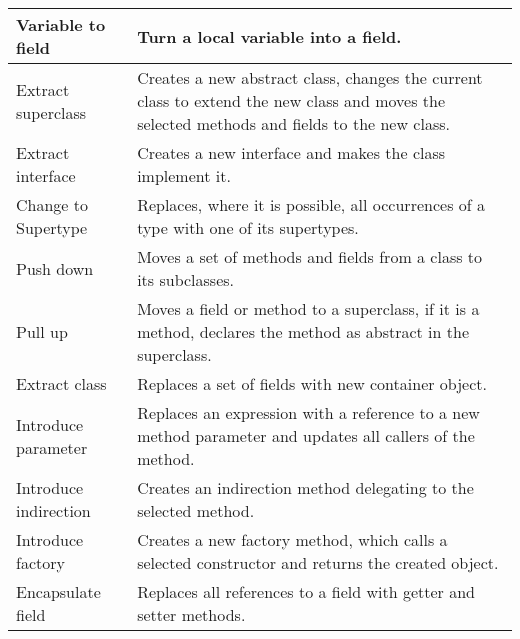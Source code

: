 \begin{table}[htbp]
\begin{tabular}{ p{2.95cm}| p{9.15cm}}
Variable to field         & Turn a local variable into a field.                                                                                                                                       \\ \hline
Extract superclass        & Creates a new abstract class, changes the current class to extend the new class and moves the selected methods and fields to the new class.                               \\ \hline
Extract interface         & Creates a new interface and makes the class implement it.                                                                                                                 \\ \hline
Change to Supertype       & Replaces, where it is possible, all occurrences of a type with one of its supertypes.                                                                                     \\ \hline
Push down                 & Moves a set of methods and fields from a class to its subclasses.                                                                                                         \\ \hline
Pull up                   & Moves a field or method to a superclass, if it is a method, declares the method as abstract in the superclass.                                                            \\ \hline
Extract class             & Replaces a set of fields with new container object.                                                                                                                       \\ \hline
Introduce parameter       & Replaces an expression with a reference to a new method parameter and updates all callers of the method.                                                                  \\ \hline
Introduce indirection     & Creates an indirection method delegating to the selected method.                                                                                                          \\ \hline
Introduce factory         & Creates a new factory method, which calls a selected constructor and returns the created object.                                                                          \\ \hline
Encapsulate field         & Replaces all references to a field with getter and setter methods.                                                                                                        \\ \hline

\end{tabular}
\end{table}
